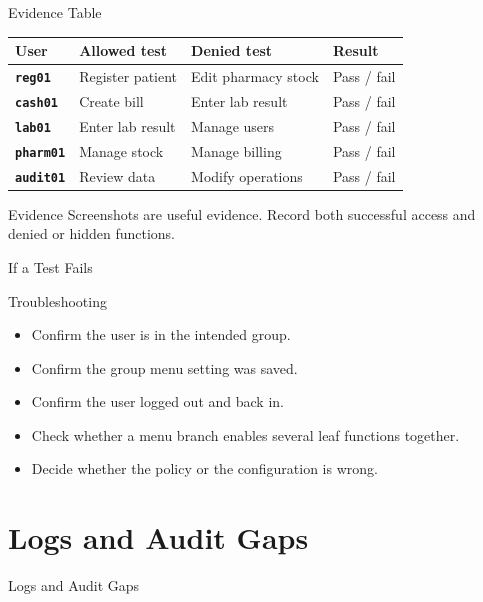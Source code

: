 \documentclass[presentation]{beamer}
\newcommand{\sectiontitleframe}[1]{
\begin{frame}[plain,c]
\begin{center}
{\usebeamerfont{title}\usebeamercolor[fg]{title}#1}
\end{center}
\end{frame}
}
\begin{document}
\begin{frame}[c]{Evidence Table}
\begin{center}
\scriptsize
\renewcommand{\arraystretch}{1.2}
\begin{tabular}{>{\bfseries}p{} p{} p{} p{}}
\toprule
User & Allowed test & Denied test & Result \\
\midrule
\texttt{reg01} & Register patient & Edit pharmacy stock & Pass / fail \\
\texttt{cash01} & Create bill & Enter lab result & Pass / fail \\
\texttt{lab01} & Enter lab result & Manage users & Pass / fail \\
\texttt{pharm01} & Manage stock & Manage billing & Pass / fail \\
\texttt{audit01} & Review data & Modify operations & Pass / fail \\
\bottomrule
\end{tabular}
\end{center}

\begin{block}{Evidence}
Screenshots are useful evidence. Record both successful access and denied or hidden functions.
\end{block}
\end{frame}

\begin{frame}[c]{If a Test Fails}
\begin{block}{Troubleshooting}
\begin{itemize}
    \item Confirm the user is in the intended group.
    \item Confirm the group menu setting was saved.
    \item Confirm the user logged out and back in.
    \item Check whether a menu branch enables several leaf functions together.
    \item Decide whether the policy or the configuration is wrong.
\end{itemize}
\end{block}
\end{frame}

\section{Logs and Audit Gaps}
\sectiontitleframe{Logs and Audit Gaps}
\end{document}
